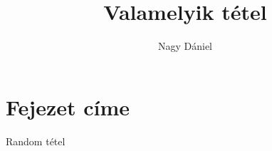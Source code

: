 \documentclass[12pt]{article}
\theoremstyle{plain}
\begin{document}
\title{Valamelyik tétel}
\author{Nagy Dániel}


\maketitle


\newpage

\section{Fejezet címe}
Random tétel
\end{document}
